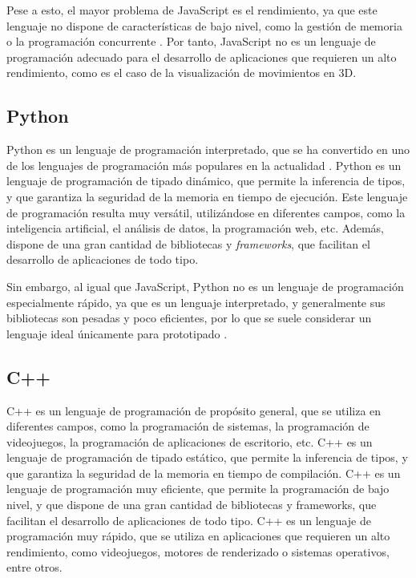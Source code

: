 Pese a esto, el mayor problema de JavaScript es el rendimiento, ya que este lenguaje no dispone de características de bajo nivel, como la gestión de memoria o la programación concurrente \autocite{MemoryManagementJavaScript2025,pengMultithreadingJavascript2017}. Por tanto, JavaScript no es un lenguaje de programación adecuado para el desarrollo de aplicaciones que requieren un alto rendimiento, como es el caso de la visualización de movimientos en 3D.

\subsection{Python}
Python es un lenguaje de programación interpretado, que se ha convertido en uno de los lenguajes de programación más populares en la actualidad \autocite{TIOBEIndex}. Python es un lenguaje de programación de tipado dinámico, que permite la inferencia de tipos, y que garantiza la seguridad de la memoria en tiempo de ejecución. Este lenguaje de programación resulta muy versátil, utilizándose en diferentes campos, como la inteligencia artificial, el análisis de datos, la programación web, etc. Además, dispone de una gran cantidad de bibliotecas y \textit{frameworks}, que facilitan el desarrollo de aplicaciones de todo tipo.

Sin embargo, al igual que JavaScript, Python no es un lenguaje de programación especialmente rápido, ya que es un lenguaje interpretado, y generalmente sus bibliotecas son pesadas y poco eficientes, por lo que se suele considerar un lenguaje ideal únicamente para prototipado \autocite{SlowestProgrammingLanguages2020}.

\subsection{C++}
C++ es un lenguaje de programación de propósito general, que se utiliza en diferentes campos, como la programación de sistemas, la programación de videojuegos, la programación de aplicaciones de escritorio, etc. C++ es un lenguaje de programación de tipado estático, que permite la inferencia de tipos, y que garantiza la seguridad de la memoria en tiempo de compilación. C++ es un lenguaje de programación muy eficiente, que permite la programación de bajo nivel, y que dispone de una gran cantidad de bibliotecas y frameworks, que facilitan el desarrollo de aplicaciones de todo tipo. C++ es un lenguaje de programación muy rápido, que se utiliza en aplicaciones que requieren un alto rendimiento, como videojuegos, motores de renderizado o sistemas operativos, entre otros. 

